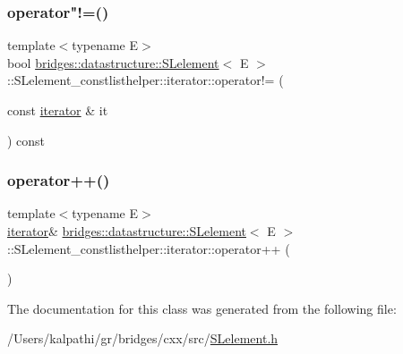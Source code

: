 \mbox{\label{classbridges_1_1datastructure_1_1_s_lelement_1_1_s_lelement__constlisthelper_1_1iterator_a65e17e54ef5f08c3deaee084951bda6a}} 
\subsubsection{\texorpdfstring{operator"!=()}{operator!=()}}
{\footnotesize\ttfamily template$<$typename E$>$ \\
bool \mbox{\hyperlink{classbridges_1_1datastructure_1_1_s_lelement}{bridges\+::datastructure\+::\+S\+Lelement}}$<$ E $>$\+::S\+Lelement\+\_\+constlisthelper\+::iterator\+::operator!= (\begin{DoxyParamCaption}\item[{const \mbox{\hyperlink{classbridges_1_1datastructure_1_1_s_lelement_1_1_s_lelement__constlisthelper_1_1iterator}{iterator}} \&}]{it }\end{DoxyParamCaption}) const\hspace{0.3cm}{\ttfamily [inline]}}

\mbox{\label{classbridges_1_1datastructure_1_1_s_lelement_1_1_s_lelement__constlisthelper_1_1iterator_a3ae6ebe78df57195446770f1c7872fdd}} 
\subsubsection{\texorpdfstring{operator++()}{operator++()}}
{\footnotesize\ttfamily template$<$typename E$>$ \\
\mbox{\hyperlink{classbridges_1_1datastructure_1_1_s_lelement_1_1_s_lelement__constlisthelper_1_1iterator}{iterator}}\& \mbox{\hyperlink{classbridges_1_1datastructure_1_1_s_lelement}{bridges\+::datastructure\+::\+S\+Lelement}}$<$ E $>$\+::S\+Lelement\+\_\+constlisthelper\+::iterator\+::operator++ (\begin{DoxyParamCaption}{ }\end{DoxyParamCaption})\hspace{0.3cm}{\ttfamily [inline]}}



The documentation for this class was generated from the following file\+:\begin{DoxyCompactItemize}
\item 
/\+Users/kalpathi/gr/bridges/cxx/src/\mbox{\hyperlink{_s_lelement_8h}{S\+Lelement.\+h}}\end{DoxyCompactItemize}
